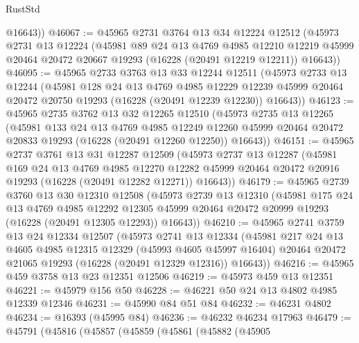 \begin{lexlean}{RustStd}
\begin{coremodule}
        @16643))
@46067 := @45965
    @2731
    @3764
    @13
    @34
    @12224
    @12512
    (@45973
      @2731
      @13
      @12224
      (@45981
        @89
        @24
        @13
        @4769
        @4985
        @12210
        @12219
        @45999
        @20464
        @20472
        @20667
        @19293
        (@16228 (@20491 @12219 @12211))
        @16643))
@46095 := @45965
    @2733
    @3763
    @13
    @33
    @12244
    @12511
    (@45973
      @2733
      @13
      @12244
      (@45981
        @128
        @24
        @13
        @4769
        @4985
        @12229
        @12239
        @45999
        @20464
        @20472
        @20750
        @19293
        (@16228 (@20491 @12239 @12230))
        @16643))
@46123 := @45965
    @2735
    @3762
    @13
    @32
    @12265
    @12510
    (@45973
      @2735
      @13
      @12265
      (@45981
        @133
        @24
        @13
        @4769
        @4985
        @12249
        @12260
        @45999
        @20464
        @20472
        @20833
        @19293
        (@16228 (@20491 @12260 @12250))
        @16643))
@46151 := @45965
    @2737
    @3761
    @13
    @31
    @12287
    @12509
    (@45973
      @2737
      @13
      @12287
      (@45981
        @169
        @24
        @13
        @4769
        @4985
        @12270
        @12282
        @45999
        @20464
        @20472
        @20916
        @19293
        (@16228 (@20491 @12282 @12271))
        @16643))
@46179 := @45965
    @2739
    @3760
    @13
    @30
    @12310
    @12508
    (@45973
      @2739
      @13
      @12310
      (@45981
        @175
        @24
        @13
        @4769
        @4985
        @12292
        @12305
        @45999
        @20464
        @20472
        @20999
        @19293
        (@16228 (@20491 @12305 @12293))
        @16643))
@46210 := @45965
    @2741
    @3759
    @13
    @24
    @12334
    @12507
    (@45973
      @2741
      @13
      @12334
      (@45981
        @217
        @24
        @13
        @4605
        @4985
        @12315
        @12329
        (@45993 @4605 @45997 @16404)
        @20464
        @20472
        @21065
        @19293
        (@16228 (@20491 @12329 @12316))
        @16643))
@46216 := @45965 @459 @3758 @13 @23 @12351 @12506
@46219 := @45973 @459 @13 @12351
@46221 := @45979 @156 @50
@46228 := @46221 @50 @24 @13 @4802 @4985 @12339 @12346
@46231 := @45990 @84 @51 @84
@46232 := @46231 @4802
@46234 := @16393 (@45995 @84)
@46236 := @46232 @46234 @17963
@46479 := @45791
    (@45816
      (@45857
        (@45859
          (@45861
            (@45882
              (@45905

\end{coremodule}
\end{lexlean}
